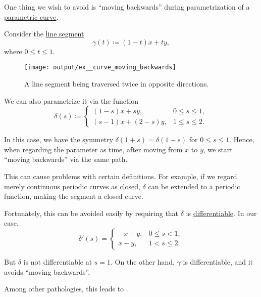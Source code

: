 \begin{example}\label{ex:curve_moving_backwards}
  One thing we wish to avoid is \enquote{moving backwards} during parametrization of a \hyperref[def:parametric_curve]{parametric curve}.

  Consider the \hyperref[def:line_segment]{line segment}
  \begin{equation*}
    \gamma(t) \coloneqq (1 - t) x + ty,
  \end{equation*}
  where \( 0 \leq t \leq 1 \).

  \begin{figure}[!ht]
    \centering
    \texttt{[image: output/ex\_\_curve\_moving\_backwards]}
    \caption{A line segment being traversed twice in opposite directions.}\label{fig:ex:curve_moving_backwards}
  \end{figure}

  We can also parametrize it via the function
  \begin{equation*}
    \delta(s) \coloneqq \begin{cases}
      (1 - s)x + sy,       &0 \leq s \leq 1, \\
      (s - 1)x + (2 - s)y, &1 \leq s \leq 2.
    \end{cases}
  \end{equation*}

  In this case, we have the symmetry \( \delta(1 + s) = \delta(1 - s) \) for \( 0 \leq s \leq 1 \). Hence, when regarding the parameter as time, after moving from \( x \) to \( y \), we start \enquote{moving backwards} via the same path.

  This can cause problems with certain definitions. For example, if we regard merely continuous periodic curves as \hyperref[def:closed_curve]{closed}, \( \delta \) can be extended to a periodic function, making the segment a closed curve.

  Fortunately, this can be avoided easily by requiring that \( \delta \) is \hyperref[def:differentiability/frechet]{differentiable}. In our case,
  \begin{equation*}
    \delta'(s) = \begin{cases}
      -x + y, &0 \leq s < 1, \\
      x - y,  &1 < s \leq 2.
    \end{cases}
  \end{equation*}

  But \( \delta \) is not differentiable at \( s = 1 \). On the other hand, \( \gamma \) is differentiable, and it avoids \enquote{moving backwards}.

  Among other pathologies, this leads to .
\end{example}

